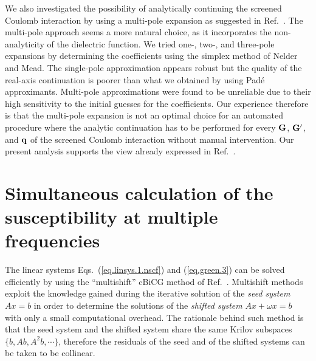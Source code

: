 \documentclass[twocolumn,prb,showpacs,superscriptaddress]{revtex4}
\def\w{\omega}
\def\q{{\bf q}}
\def\G{{\bf G}}
\def\Gp{{\bf G^\prime}}
\begin{document}
We also investigated the possibility of analytically continuing
the screened Coulomb interaction by using a multi-pole expansion
as suggested in Ref.\ . The multi-pole approach
seems a more natural choice, as it incorporates the non-analyticity
of the dielectric function. We tried one-, two-, and three-pole
expansions by determining the coefficients using the simplex 
method of Nelder and Mead.\cite{nelder-mead}
The single-pole approximation appears robust but the quality
of the real-axis continuation is poorer than what we obtained
by using Pad\'e approximants. Multi-pole approximations were found
to be unreliable due to their high sensitivity to the initial guesses 
for the coefficients.
Our experience therefore is that the multi-pole expansion is not an optimal 
choice for an automated procedure where the analytic continuation has to be
performed for every $\G$, $\Gp$, and $\q$ of the screened Coulomb 
interaction without manual intervention. Our present analysis supports the view 
already expressed in Ref.\ .


\section{Simultaneous calculation of the susceptibility at multiple frequencies}\label{app.multishift}

The linear systems Eqs.\ (\ref{eq.linsys.1.nscf}) and (\ref{eq.green.3})
can be solved efficiently by using the ``multishift'' 
cBiCG method of Ref.~.
Multishift methods exploit the knowledge gained during the iterative
solution of the {\it seed system} $Ax=b$ in order to determine the solutions 
of the {\it shifted system} $Ax+\w x=b$ with only a small computational overhead.
The rationale behind such method is that the seed system and the
shifted system share the same Krilov subspaces $\{b,Ab,A^2b,\cdots\}$,
therefore the residuals of the seed and of the shifted
systems can be taken to be collinear.\cite{frommer}
\end{document}
